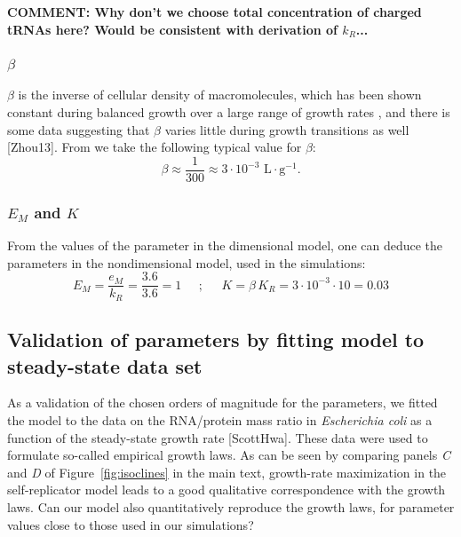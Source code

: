 \textbf{COMMENT: Why don't we choose total concentration of charged tRNAs here? Would be consistent with derivation of $k_R$...}

\subsubsection{\texorpdfstring{$\beta$}{Beta}}

$\beta$ is the inverse of cellular density of macromolecules, which has been shown constant during balanced growth over a large range of growth rates \cite{churchward_macromolecular_1982}, and there is some data suggesting that $\beta$ varies little during growth transitions as well [Zhou13].
From \cite{zimmerman_estimation_1991,mcguffee_diffusion_2010} we take the following typical value for $\beta$:
\[
\beta \approx \frac{1}{300} \approx 3\cdot 10^{-3} \text{ L} \cdot \text{g}^{-1}.
\]

\subsubsection{\texorpdfstring{$E_M$}{EM} and \texorpdfstring{$K$}{K}}

From the values of the parameter in the dimensional model, one can deduce the parameters in the nondimensional model, used in the simulations:
\[
E_M = \frac{e_M}{k_R} = \frac{3.6}{3.6} = 1 \;\;\;\;\; ; \;\;\;\;\;  K = \beta\, K_R = 3\cdot 10^{-3} \cdot 10 = 0.03
\]

\subsection{Validation of parameters by fitting model to steady-state data set}

As a validation of the chosen orders of magnitude for the parameters, we fitted the model to the data on the RNA/protein mass ratio in \textit{Escherichia coli} as a function of the steady-state growth rate [ScottHwa].
These data were used to formulate so-called empirical growth laws.
As can be seen by comparing panels \textit{C} and \textit{D} of Figure~\ref{fig:isoclines} in the main text, growth-rate maximization in the self-replicator model leads to a good qualitative correspondence with the growth laws.
Can our model also quantitatively reproduce the growth laws, for parameter values close to those used in our simulations? 

